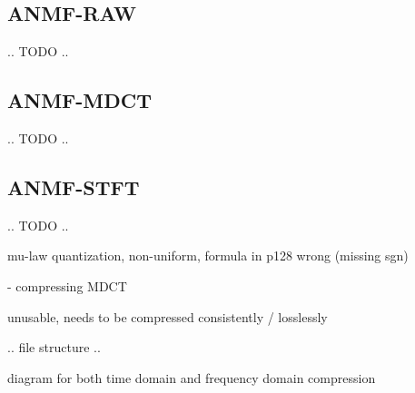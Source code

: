 \subsection{ANMF-RAW}
.. TODO ..

\subsection{ANMF-MDCT}
.. TODO ..

\subsection{ANMF-STFT}
.. TODO ..

mu-law quantization, non-uniform, formula in p128 wrong (missing sgn)\

- compressing MDCT

unusable, needs to be compressed consistently / losslessly

.. file structure ..

diagram for both time domain and frequency domain compression

